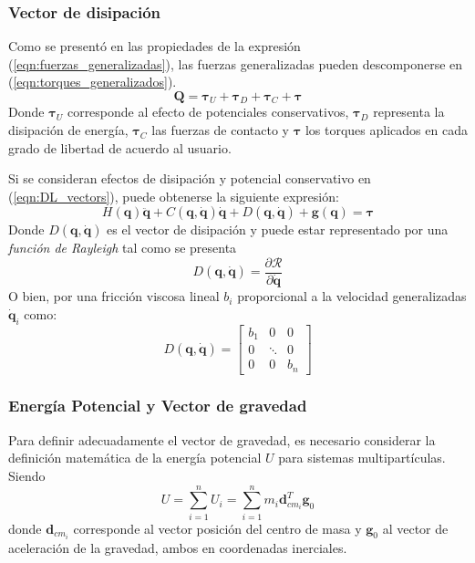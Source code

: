     \subsubsection{Vector de disipación}
    Como se presentó en las propiedades de la expresión (\ref{eqn:fuerzas_generalizadas}), las fuerzas generalizadas pueden descomponerse en (\ref{eqn:torques_generalizados}).
    \begin{equation}
        \label{eqn:torques_generalizados}
         \boldsymbol{Q} = \boldsymbol{\tau}_U + \boldsymbol{\tau}_D + \boldsymbol{\tau}_C + \boldsymbol{\tau}
    \end{equation}
    Donde $\boldsymbol{\tau}_U$ corresponde al efecto de potenciales conservativos, $\boldsymbol{\tau}_D$ representa la disipación de energía, $\boldsymbol{\tau}_C$
    las fuerzas de contacto y $\boldsymbol{\tau}$ los torques aplicados en cada grado de libertad de acuerdo al usuario. 
    
    Si se consideran efectos de disipación y potencial conservativo en (\ref{eqn:DL_vectors}), puede obtenerse la siguiente expresión:
    \begin{equation}
        \label{eqn:DL_final}
        H(\boldsymbol{q}) \boldsymbol{\ddot{q}} + C(\boldsymbol{q}, \boldsymbol{\dot{q}}) \boldsymbol{\dot{q}} + D(\boldsymbol{q}, \boldsymbol{\dot{q}})
        + \boldsymbol{g}(\boldsymbol{q}) = \boldsymbol{\tau}
    \end{equation}
    Donde $D(\boldsymbol{q}, \boldsymbol{\dot{q}})$ es el vector de disipación y puede estar representado por una \emph{función de Rayleigh} tal como se presenta
    \begin{equation}
        \label{eqn:disipacion_ray}
        D(\boldsymbol{q}, \boldsymbol{\dot{q}}) = \frac{\partial \mathcal{R}}{\partial \boldsymbol{\dot{q}}}
    \end{equation} 
    O bien, por una fricción viscosa lineal $b_i$ proporcional a la velocidad generalizadas $\boldsymbol{\dot{q}}_i$ como:
    \begin{equation}
        \label{eqn:disipacion_simple}
        D(\boldsymbol{q}, \boldsymbol{\dot{q}}) = \begin{bmatrix} b_1 & 0 & 0 \\ 0 & \ddots & 0 \\ 0 & 0 & b_n  \end{bmatrix} 
    \end{equation}

    \subsubsection{Energía Potencial y Vector de gravedad}
    Para definir adecuadamente el vector de gravedad, es necesario considerar la definición matemática de la energía potencial $U$ para sistemas multipartículas. Siendo
    \begin{equation}
        \label{eqn:energia_potencial}
         U = \sum_{i=1}^n U_i =  \sum_{i=1}^n m_i \boldsymbol{d}_{cm_i}^T \boldsymbol{g}_0
    \end{equation}
    donde $\boldsymbol{d}_{cm_i}$ corresponde al vector posición del centro de masa y $\boldsymbol{g}_0$ al vector de aceleración de la gravedad, ambos
    en coordenadas inerciales. 

